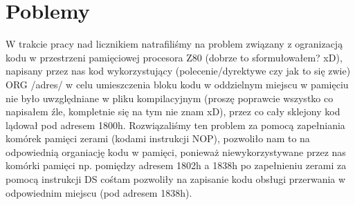 \documentclass[fleqn]{article}
\begin{document}
\section{Poblemy}
W trakcie pracy nad licznikiem natrafiliśmy na problem związany z ogranizacją kodu w przestrzeni pamięciowej procesora Z80 (dobrze to sformułowałem? xD), napisany przez nas kod wykorzystujący (polecenie/dyrektywe czy jak to się zwie) ORG /adres/ w celu umieszczenia bloku kodu w oddzielnym miejscu w pamięciu nie było uwzględniane w pliku kompilacyjnym (proszę poprawcie wszystko co napisałem źle, kompletnie się na tym nie znam xD), przez co cały sklejony kod lądował pod adresem 1800h. Rozwiązaliśmy ten problem za pomocą zapełniania komórek pamięci zerami (kodami instrukcji NOP), pozwoliło nam to na odpowiednią organiację kodu w pamięci, ponieważ niewykorzystywane przez nas komórki pamięci np. pomiędzy adresem 1802h a 1838h po zapełnieniu zerami za pomocą instrukcji DS cośtam pozwoliły na zapisanie kodu obsługi przerwania w odpowiednim miejscu (pod adresem 1838h).
\end{document}
